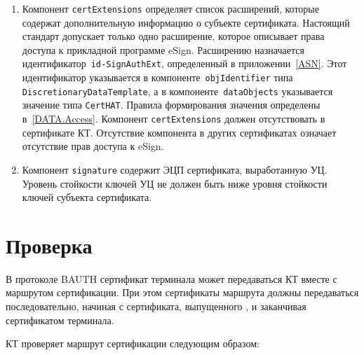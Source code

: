 \begin{enumerate}
\item
Компонент \verb|certExtensions| определяет список расширений, 
которые содержат дополнительную информацию о субъекте сертификата. 
%
Настоящий стандарт допускает только одно расширение, которое описывает 
права доступа к прикладной программе eSign. 
Расширению назначается идентификатор~\verb|id-SignAuthExt|,
определенный в приложении~\ref{ASN}. Этот идентификатор указывается
в компоненте~\texttt{objIdentifier} типа \texttt{DiscretionaryDataTemplate},
а в компоненте~\texttt{dataObjects} указывается значение типа \verb|CertHAT|.
Правила формирования значения определены в~\ref{DATA.Access}. 
%
Компонент \verb|certExtensions| должен отсутствовать в сертификате КТ.
%
Отсутствие компонента в других сертификатах означает отсутствие прав доступа к 
eSign. 

\item
Компонент \verb|signature| содержит ЭЦП сертификата, выработанную УЦ.
Уровень стойкости ключей УЦ не должен быть ниже уровня стойкости 
ключей субъекта сертификата.
\end{enumerate}

\section{Проверка}\label{CERTS.Path}

В протоколе BAUTH сертификат терминала может передаваться КТ вместе с маршрутом 
сертификации. При этом сертификаты маршрута должны передаваться 
последовательно, начиная с сертификата, выпущенного , и заканчивая 
сертификатом терминала. 


КТ проверяет маршрут сертификации следующим образом:

